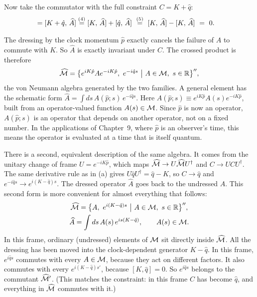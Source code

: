 Now take the commutator with the full constraint $C = K + \hat q$:
\begin{align}
[C, \, \widehat A] = [K + \hat q, \, \widehat A]
&\eqstep{4} [K, \, \widehat A] + [\hat q, \, \widehat A]
\ \eqstep{5}\ [K, \, \widehat A] - [K, \, \widehat A] \ =\ 0 . \notag
\end{align}
\quad
{}

The dressing by the clock momentum $\hat p$ exactly cancels the failure of $A$ to commute with $K$. So
$\widehat A$ is exactly invariant under $C$. The crossed product is therefore
\begin{equation}
\widehat\M = \big\{e^{iK\hat p}Ae^{-iK\hat p},\ e^{-i\hat qs} \ \big|\ A\in\M,\ s\in\mathbb R\big\}'' ,
\label{eq:cp-generators}
\end{equation}
the von Neumann algebra generated by the two families. A general element has the schematic form
$\widehat A=\int ds\,A(\hat p;s)\,e^{-i\hat qs}$. Here $A(\hat p;s)\equiv e^{iK\hat p}A(s)e^{-iK\hat p}$, built
from an operator-valued function $A(s)\in\mathcal{M}$. Since $\hat p$ is now an operator, $A(\hat p;s)$ is an operator
that depends on another operator, not on a fixed number. In the applications of Chapter~9, where $\hat p$ is an
observer's time, this means the operator is evaluated at a time that is itself quantum.

There is a second, equivalent description of the same algebra. It comes from the unitary change of frame
$U=e^{-iK\hat p}$, which maps $\widehat{\mathcal{M}}\to U\widehat{\mathcal{M}} U^\dagger$ and $C\to UCU^\dagger$. The same derivative
rule as in (a) gives $U\hat qU^\dagger=\hat q-K$, so $C\to\hat q$ and $e^{-i\hat qs}\to e^{i(K-\hat q)s}$. The
dressed operator $\widehat A$ goes back to the undressed $A$. This second form is more convenient for almost
everything that follows:
\begin{equation}
\begin{gathered}
\widehat{\mathcal{M}} = \big\{A,\ e^{i(K-\hat q)s} \ \big|\ A\in\mathcal{M},\ s\in\mathbb R\big\}'', \\
\widehat A = \int ds\, A(s)\,e^{is(K-\hat q)}, \qquad A(s)\in\mathcal{M} .
\end{gathered}
\label{eq:cp-frame2}
\end{equation}
In this frame, ordinary (undressed) elements of $\mathcal{M}$ sit directly inside $\widehat{\mathcal{M}}$. All the dressing has
been moved into the clock-dependent generator $K-\hat q$. In this frame, $e^{i\hat qs}$ commutes with every
$A\in\mathcal{M}$, because they act on different factors. It also commutes with every $e^{i(K-\hat q)s'}$, because
$[K,\hat q]=0$. So $e^{i\hat qs}$ belongs to the commutant $\widehat{\mathcal{M}}'$. (This matches the constraint: in this
frame $C$ has become $\hat q$, and everything in $\widehat{\mathcal{M}}$ commutes with it.)

